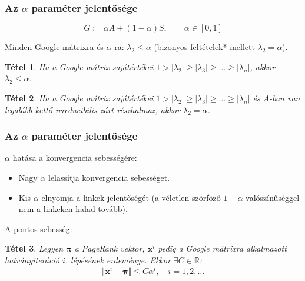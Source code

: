 \documentclass[]{beamer}
\newcommand{\bx}{\mathbf{x}}
\newtheorem{tetel}{Tétel}
\begin{document}
\begin{frame}
	\frametitle{Az $\alpha$ paraméter jelentősége}
	
	\[ G := \alpha A + (1-\alpha) S, \qquad \alpha \in [0,1] \]
	
	Minden Google mátrixra és $\alpha$-ra: $\lambda_2 \leq \alpha$ (bizonyos feltételek* mellett $\lambda_2 = \alpha$).
	
	\begin{tetel}
		Ha a Google mátrix sajátértékei $ 1 > |\lambda_2| \geq |\lambda_3| \geq \ldots \geq |\lambda_n|$, akkor $\lambda_2 \leq \alpha$.
	\end{tetel}

	\begin{tetel}
		Ha a Google mátrix sajátértékei $ 1 > |\lambda_2| \geq |\lambda_3| \geq \ldots \geq |\lambda_n |$ és $A$-ban van legalább kettő irreducibilis zárt részhalmaz, akkor $\lambda_2 = \alpha$.
	\end{tetel}
\end{frame}

\begin{frame}
	\frametitle{Az $\alpha$ paraméter jelentősége}

	$\alpha$ hatása a konvergencia sebességére:
	\begin{itemize}
		\item Nagy $\alpha$ lelassítja konvergencia sebességet.
		\item Kis $\alpha$ elnyomja a linkek jelentőségét (a véletlen szörföző $1-\alpha$ valószínűséggel nem a linkeken halad tovább).
	\end{itemize}

	A pontos sebesség:
	\begin{tetel}
		Legyen $\bm{\pi}$ a PageRank vektor, $\bx^i$ pedig a Google mátrixra alkalmazott hatványiteráció $i$. lépésének erdeménye. 	Ekkor $\exists C \in \mathbb{R}$:
		\[ \Vert \bx^i - \bm{\pi} \Vert \leq C \alpha^i, \quad i = 1,2,\ldots \]
	\end{tetel}
\end{frame}
\end{document}
